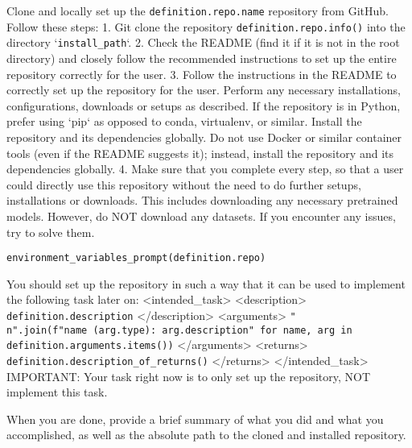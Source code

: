 \begin{tcolorbox}[title={\texttt{Install Repository User Instructions}}]
Clone and locally set up the \texttt{{definition.repo.name}} repository from GitHub.
Follow these steps:
1. Git clone the repository \texttt{{definition.repo.info()}} into the directory `\texttt{{install\_path}}`.
2. Check the README (find it if it is not in the root directory) and closely follow the recommended instructions to set up the entire repository correctly for the user.
3. Follow the instructions in the README to correctly set up the repository for the user. Perform any necessary installations, configurations, downloads or setups as described. If the repository is in Python, prefer using `pip` as opposed to conda, virtualenv, or similar. Install the repository and its dependencies globally. Do not use Docker or similar container tools (even if the README suggests it); instead, install the repository and its dependencies globally.
4. Make sure that you complete every step, so that a user could directly use this repository without the need to do further setups, installations or downloads. This includes downloading any necessary pretrained models. However, do NOT download any datasets.
If you encounter any issues, try to solve them.

\texttt{{environment\_variables\_prompt(definition.repo)}}

You should set up the repository in such a way that it can be used to implement the following task later on:
<intended\_task>
<description>
\texttt{{definition.description}}
</description>
<arguments>
\texttt{{"\\n".join(f"{name} ({arg.type}): {arg.description}" for name, arg in definition.arguments.items())}}
</arguments>
<returns>
\texttt{{definition.description\_of\_returns()}}
</returns>
</intended\_task>
IMPORTANT: Your task right now is to only set up the repository, NOT implement this task.

When you are done, provide a brief summary of what you did and what you accomplished, as well as the absolute path to the cloned and installed repository.
\end{tcolorbox}

